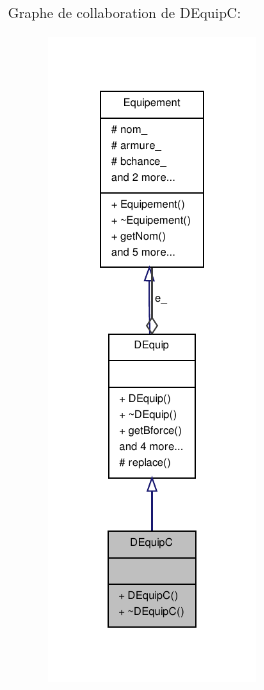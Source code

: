 Graphe de collaboration de D\-Equip\-C\-:
\nopagebreak
\begin{figure}[H]
\begin{center}
\leavevmode
\includegraphics[width=156pt]{class_d_equip_c__coll__graph}
\end{center}
\end{figure}
